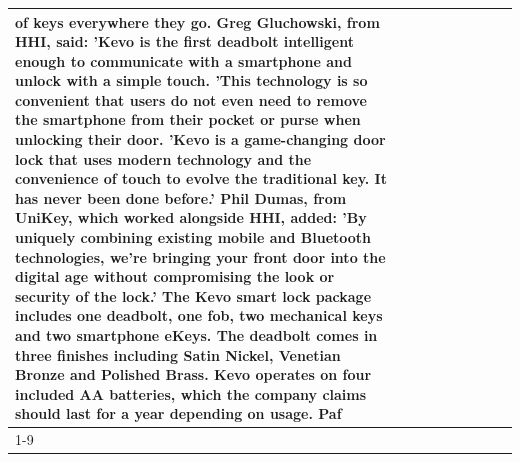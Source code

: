 \begin{table}[H]
\begin{tabular}{lllrlllll}
of keys everywhere they go. Greg Gluchowski, from HHI, said: 'Kevo is the first deadbolt intelligent enough to communicate with a smartphone and unlock with a simple touch. 'This technology is so convenient that users do not even need to remove the smartphone from their pocket or purse when unlocking their door. 'Kevo is a game-changing door lock that uses modern technology and the convenience of touch to evolve the traditional key. It has never been done before.' Phil Dumas, from UniKey, which worked alongside HHI, added: 'By uniquely combining existing mobile and Bluetooth technologies, we’re bringing your front door into the digital age without compromising the look or security of the lock.' The Kevo smart lock package includes one deadbolt, one fob, two mechanical keys and two smartphone eKeys. The deadbolt comes in three finishes including Satin Nickel, Venetian Bronze and Polished Brass. Kevo operates on four included AA batteries, which the company claims should last for a year depending on usage. Paf \\
\cline{1-9}

\end{tabular}
\end{table}
